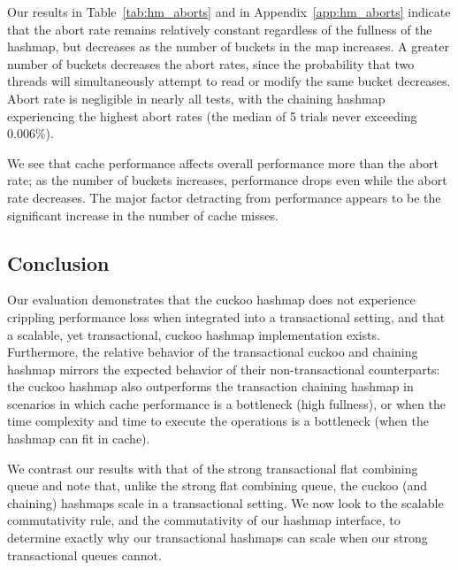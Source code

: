     Our results in Table~\ref{tab:hm_aborts} and in Appendix~\ref{app:hm_aborts} indicate that the abort rate remains relatively constant regardless of the fullness of the hashmap, but decreases as the number of buckets in the map increases. A greater number of buckets decreases the abort rates, since the probability that two threads will simultaneously attempt to read or modify the same bucket decreases. Abort rate is negligible in nearly all tests, with the chaining hashmap experiencing the highest abort rates (the median of 5 trials never exceeding 0.006\%).

We see that cache performance affects overall performance more than the abort rate; as the number of buckets increases, performance drops even while the abort rate decreases. The major factor detracting from performance appears to be the significant increase in the number of cache misses.

\vspace{12pt}
\noindent{}

\subsection{Conclusion}

Our evaluation demonstrates that the cuckoo hashmap does not experience crippling performance loss when integrated into a transactional setting, and that a scalable, yet transactional, cuckoo hashmap implementation exists. Furthermore, the relative behavior of the transactional cuckoo and chaining hashmap mirrors the expected behavior of their non-transactional counterparts: the cuckoo hashmap also outperforms the transaction chaining hashmap in scenarios in which cache performance is a bottleneck (high fullness), or when the time complexity and time to execute the operations is a bottleneck (when the hashmap can fit in cache). 

We contrast our results with that of the strong transactional flat combining queue and note that, unlike the strong flat combining queue, the cuckoo (and chaining) hashmaps scale in a transactional setting. We now look to the scalable commutativity rule, and the commutativity of our hashmap interface, to determine exactly why our transactional hashmaps can scale when our strong transactional queues cannot. 

